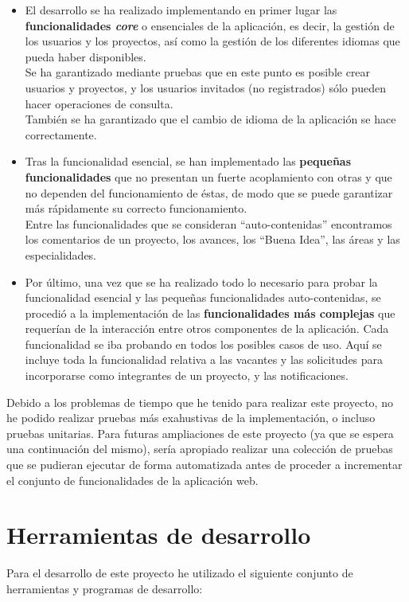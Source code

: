 \begin{itemize}
    \item El desarrollo se ha realizado implementando en primer lugar las \textbf{funcionalidades \textit{core}} o ensenciales de la aplicación, es decir, la gestión de los usuarios y los proyectos, así como la gestión de los diferentes idiomas que pueda haber disponibles.\\
    Se ha garantizado mediante pruebas que en este punto es posible crear usuarios y proyectos, y los usuarios invitados (no registrados) sólo pueden hacer operaciones de consulta.\\
    También se ha garantizado que el cambio de idioma de la aplicación se hace correctamente.
    \item Tras la funcionalidad esencial, se han implementado las \textbf{pequeñas funcionalidades} que no presentan un fuerte acoplamiento con otras y que no dependen del funcionamiento de éstas, de modo que se puede garantizar más rápidamente su correcto funcionamiento.\\
    Entre las funcionalidades que se consideran ``auto-contenidas'' encontramos los comentarios de un proyecto, los avances, los ``Buena Idea'', las áreas y las especialidades.
    \item Por último, una vez que se ha realizado todo lo necesario para probar la funcionalidad esencial y las pequeñas funcionalidades auto-contenidas, se procedió a la implementación de las \textbf{funcionalidades más complejas} que requerían de la interacción entre otros componentes de la aplicación. Cada funcionalidad se iba probando en todos los posibles casos de uso. Aquí se incluye toda la funcionalidad relativa a las vacantes y las solicitudes para incorporarse como integrantes de un proyecto, y las notificaciones.
\end{itemize}

Debido a los problemas de tiempo que he tenido para realizar este proyecto, no he podido realizar pruebas más exahustivas de la implementación, o incluso pruebas unitarias. Para futuras ampliaciones de este proyecto (ya que se espera una continuación del mismo), sería apropiado realizar una colección de pruebas que se pudieran ejecutar de forma automatizada antes de proceder a incrementar el conjunto de funcionalidades de la aplicación web.

\section{Herramientas de desarrollo}
Para el desarrollo de este proyecto he utilizado el siguiente conjunto de herramientas y programas de desarrollo:

